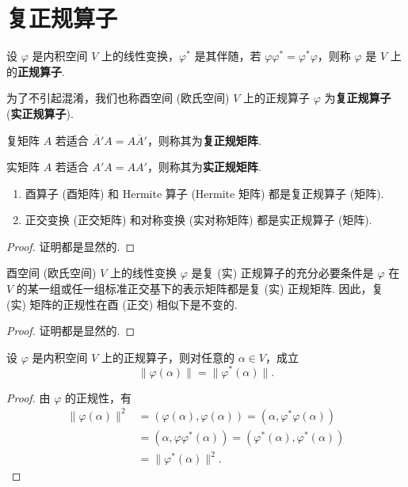 \documentclass[../../main.tex]{subfiles}%
\begin{document}
\section{复正规算子}

\begin{definition}[正规算子和正规矩阵]
设 $\varphi$ 是内积空间 $V$ 上的线性变换，$\varphi^*$ 是其伴随，若 $\varphi\varphi^* = \varphi^*\varphi$，则称 $\varphi$ 是 $V$ 上的\textbf{正规算子}. 

为了不引起混淆，我们也称酉空间 (欧氏空间) $V$ 上的正规算子 $\varphi$ 为\textbf{复正规算子} (\textbf{实正规算子}). 

复矩阵 $A$ 若适合 $\overline{A}'A = A\overline{A}'$，则称其为\textbf{复正规矩阵}. 

实矩阵 $A$ 若适合 $A'A = AA'$，则称其为\textbf{实正规矩阵}.
\end{definition}

\begin{proposition}\label{proposition:常见的正规矩阵}
\begin{enumerate}
\item 酉算子 (酉矩阵) 和 Hermite 算子 (Hermite 矩阵) 都是复正规算子 (矩阵).

\item 正交变换 (正交矩阵) 和对称变换 (实对称矩阵) 都是实正规算子 (矩阵).
\end{enumerate}
\end{proposition}
\begin{proof}

证明都是显然的.

\end{proof}

\begin{theorem}
酉空间 (欧氏空间) $V$ 上的线性变换 $\varphi$ 是复 (实) 正规算子的充分必要条件是 $\varphi$ 在 $V$ 的某一组或任一组标准正交基下的表示矩阵都是复 (实) 正规矩阵. 因此，复 (实) 矩阵的正规性在酉 (正交) 相似下是不变的. 
\end{theorem}
\begin{proof}

证明都是显然的.

\end{proof}

\begin{lemma}\label{lemma:正规算子与伴随的像的范数相同}
设 $\varphi$ 是内积空间 $V$ 上的正规算子，则对任意的 $\alpha \in V$，成立
\[
\|\varphi(\alpha)\| = \|\varphi^*(\alpha)\|.
\]
\end{lemma}
\begin{proof}

由 $\varphi$ 的正规性，有
\begin{align*}
\|\varphi(\alpha)\|^2 &= (\varphi(\alpha),\varphi(\alpha)) = (\alpha,\varphi^*\varphi(\alpha))\\
&= (\alpha,\varphi\varphi^*(\alpha)) = (\varphi^*(\alpha),\varphi^*(\alpha))\\
&= \|\varphi^*(\alpha)\|^2. 
\end{align*}

\end{proof}
\end{document}
